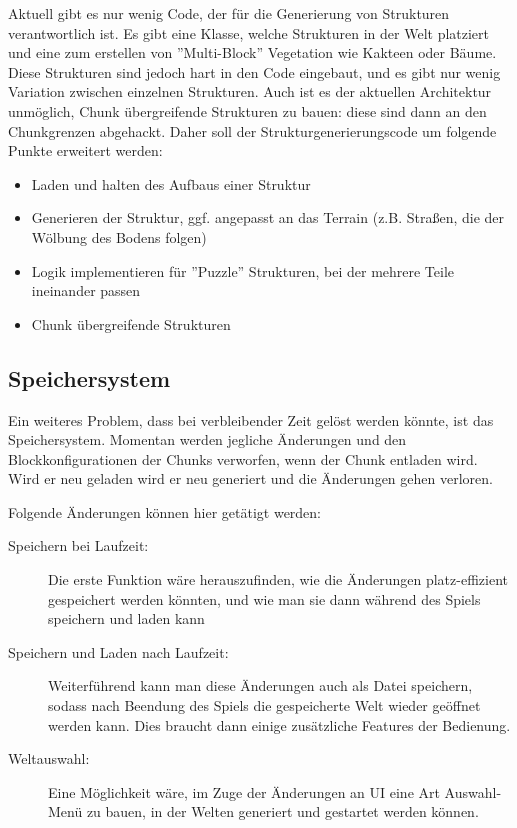 \documentclass{article}
\begin{document}
Aktuell gibt es nur wenig Code, der für die Generierung von Strukturen
verantwortlich ist. Es gibt eine Klasse, welche Strukturen in der Welt platziert
und eine zum erstellen von ''Multi-Block'' Vegetation wie Kakteen oder Bäume.
Diese Strukturen sind jedoch hart in den Code eingebaut, und es gibt nur wenig
Variation zwischen einzelnen Strukturen. Auch ist es der aktuellen Architektur
unmöglich, Chunk übergreifende Strukturen zu bauen: diese sind dann an den
Chunkgrenzen abgehackt. Daher soll der Strukturgenerierungscode um folgende
Punkte erweitert werden:

\begin{itemize}
	\item Laden und halten des Aufbaus einer Struktur
	\item Generieren der Struktur, ggf. angepasst an das Terrain (z.B. Stra\ss{}en,
	die der Wölbung des Bodens folgen)
	\item Logik implementieren für ''Puzzle'' Strukturen, bei der mehrere Teile
	ineinander passen
	\item Chunk übergreifende Strukturen
\end{itemize}

\subsection{Speichersystem}

Ein weiteres Problem, dass bei verbleibender Zeit gelöst werden könnte, ist das Speichersystem. Momentan werden jegliche Änderungen und den Blockkonfigurationen der Chunks verworfen, wenn der Chunk entladen wird. Wird er neu geladen wird er neu generiert und die Änderungen gehen verloren. 

Folgende Änderungen können hier getätigt werden:

\begin{description}
  \item[Speichern bei Laufzeit:] Die erste Funktion wäre herauszufinden, wie die Änderungen platz-effizient gespeichert werden könnten, und wie man sie dann während des Spiels speichern und laden kann
  \item[Speichern und Laden nach Laufzeit:] Weiterführend kann man diese Änderungen auch als Datei speichern, sodass nach Beendung des Spiels die gespeicherte Welt wieder geöffnet werden kann. Dies braucht dann einige zusätzliche Features der Bedienung.
  \item[Weltauswahl:] Eine Möglichkeit wäre, im Zuge der Änderungen an UI eine Art Auswahl-Menü zu bauen, in der Welten generiert und gestartet werden können.
\end{description}
\end{document}
